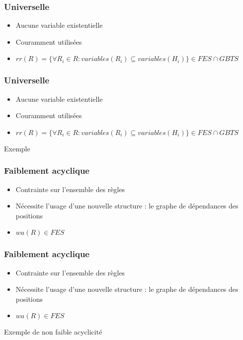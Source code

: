 \begin{frame}
	\frametitle{Universelle}
	\begin{itemize}
		\item Aucune variable existentielle
		\item Couramment utilisées
		\item $rr(R) = \{\forall R_i \in R : variables(R_i) \subseteq variables(H_i) \}
		\in FES \cap GBTS$
	\end{itemize}
	\vspace{10mm}
\end{frame}

\begin{frame}
	\frametitle{Universelle}
	\begin{itemize}
		\item Aucune variable existentielle
		\item Couramment utilisées
		\item $rr(R) = \{\forall R_i \in R : variables(R_i) \subseteq variables(H_i) \}
		\in FES \cap GBTS$
	\end{itemize}
	\vspace{10mm}
	\begin{exampleblock}{Exemple}
	\end{exampleblock}
\end{frame}

\begin{frame}
	\frametitle{Faiblement acyclique}
	\begin{itemize}
		\item Contrainte sur l'ensemble des règles
		\item Nécessite l'usage d'une nouvelle structure : le graphe de dépendances des
		positions
		\item $wa(R) \in FES$
	\end{itemize}
\end{frame}

\begin{frame}
	\frametitle{Faiblement acyclique}
	\begin{itemize}
		\item Contrainte sur l'ensemble des règles
		\item Nécessite l'usage d'une nouvelle structure : le graphe de dépendances des
		positions
		\item $wa(R) \in FES$
	\end{itemize}
	\begin{exampleblock}{Exemple de non faible acyclicité}
		 \\
		 \\
	\end{exampleblock}
\end{frame}

